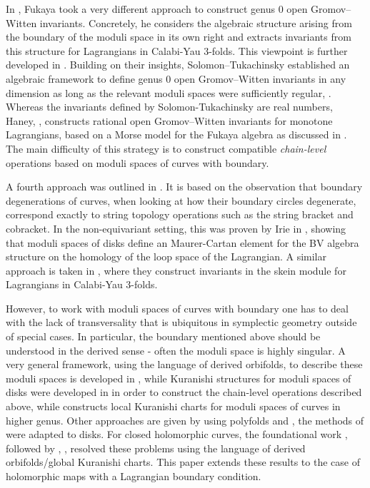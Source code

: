 \documentclass[11pt,psamsfonts, oneside, reqno]{amsart}
\theoremstyle{definition}
\theoremstyle{remark}
\numberwithin{equation}{section}
\begin{document}
In \cite{Fu10,Fuk11}, Fukaya took a very different approach to construct genus $0$ open Gromov--Witten invariants. Concretely, he considers the algebraic structure arising from the boundary of the moduli space in its own right and extracts invariants from this structure for Lagrangians in Calabi-Yau $3$-folds. This viewpoint is further developed in \cite{FOOO,FOOO18,FOOOToric1,FOOO24}.
Building on their insights, Solomon--Tukachinsky established an algebraic framework to define genus $0$ open Gromov--Witten invariants in any dimension as long as the relevant moduli spaces were sufficiently regular, \cite{ST1,ST16,ST23}. Whereas the invariants defined by Solomon-Tukachinsky are real numbers, Haney, \cite{Han24}, constructs rational open Gromov--Witten invariants for monotone Lagrangians, based on a Morse model for the Fukaya algebra as discussed in \cite{CW17}. The main difficulty of this strategy is to construct compatible \emph{chain-level} operations based on moduli spaces of curves with boundary.

A fourth approach was outlined in \cite{Fuk06}. It is based on the observation that boundary degenerations of curves, when looking at how their boundary circles degenerate, correspond exactly to string topology operations such as the string bracket and cobracket. In the non-equivariant setting, this was proven by Irie in \cite{Iri18,Iri20}, showing that moduli spaces of disks define an Maurer-Cartan element for the BV algebra structure on the homology of the loop space of the Lagrangian. A similar approach is taken in \cite{ES24}, where they construct invariants in the skein module for Lagrangians in Calabi-Yau $3$-folds.

However, to work with moduli spaces of curves with boundary one has to deal with the lack of transversality that is ubiquitous in symplectic geometry outside of special cases. In particular, the boundary mentioned above should be understood in the derived sense - often the moduli space is highly singular. A very general framework, using the language of derived orbifolds, to describe these moduli spaces is developed in \cite{Par25}, while Kuranishi structures for moduli spaces of disks were developed in \cite{Fu10,Fuk11,FOOO16,FOOO18,FOOOToric1} in order to construct the chain-level operations described above, while \cite{Liu20} constructs local Kuranishi charts for moduli spaces of curves in higher genus. Other approaches are given by \cite{Jo19} using polyfolds and \cite{She15}, the methods of \cite{CM07} were adapted to disks. For closed holomorphic curves, the foundational work \cite{AMS21}, followed by \cite{AMS23}, \cite{HS22}, resolved these problems using the language of derived orbifolds/global Kuranishi charts. This paper extends these results to the case of holomorphic maps with a Lagrangian boundary condition.
 
\end{document}
